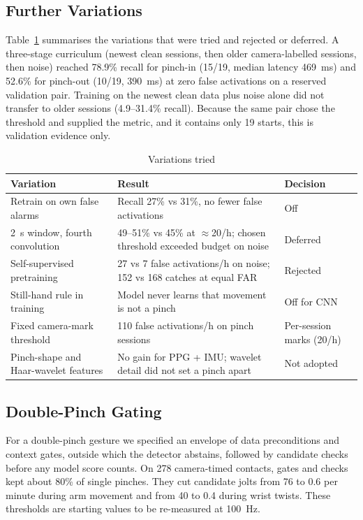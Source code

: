 \subsection{Further Variations}

Table~\ref{tab:variations} summarises the variations that were tried and rejected or deferred. A three-stage curriculum (newest clean sessions, then older camera-labelled sessions, then noise) reached 78.9\% recall for pinch-in (15/19, median latency 469~ms) and 52.6\% for pinch-out (10/19, 390~ms) at zero false activations on a reserved validation pair. Training on the newest clean data plus noise alone did not transfer to older sessions (4.9--31.4\% recall). Because the same pair chose the threshold and supplied the metric, and it contains only 19 starts, this is validation evidence only.

\begin{table}[t]
  \centering
  \caption{Variations tried}
  \label{tab:variations}
  \small
  \begin{tabular}{@{}p{}p{}p{}@{}}
    \toprule
    Variation & Result & Decision \\
    \midrule
    Retrain on own false alarms & Recall 27\% vs 31\%, no fewer false activations & Off \\
    2~s window, fourth convolution & 49--51\% vs 45\% at $\approx$20/h; chosen threshold exceeded budget on noise & Deferred \\
    Self-supervised pretraining & 27 vs 7 false activations/h on noise; 152 vs 168 catches at equal FAR & Rejected \\
    Still-hand rule in training & Model never learns that movement is not a pinch & Off for CNN \\
    Fixed camera-mark threshold & 110 false activations/h on pinch sessions & Per-session marks (20/h) \\
    Pinch-shape and Haar-wavelet features & No gain for PPG + IMU; wavelet detail did not set a pinch apart & Not adopted \\
    \bottomrule
  \end{tabular}
\end{table}

\subsection{Double-Pinch Gating}

For a double-pinch gesture we specified an envelope of data preconditions and context gates, outside which the detector abstains, followed by candidate checks before any model score counts. On 278 camera-timed contacts, gates and checks kept about 80\% of single pinches. They cut candidate jolts from 76 to 0.6 per minute during arm movement and from 40 to 0.4 during wrist twists. These thresholds are starting values to be re-measured at 100~Hz.

